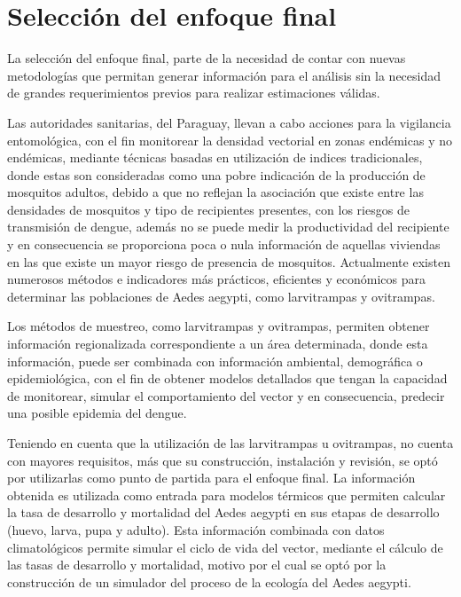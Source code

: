 \section{Selección del enfoque final}
La selección del enfoque final, parte de la necesidad de contar con nuevas metodologías que
permitan generar información para el análisis sin la necesidad de grandes requerimientos previos
para realizar estimaciones válidas.

Las autoridades sanitarias, del Paraguay, llevan a cabo acciones para la vigilancia entomológica,
con el fin monitorear la densidad vectorial en zonas endémicas y no endémicas, mediante técnicas
basadas en utilización de indices tradicionales, donde estas son consideradas como una pobre
indicación de la producción de mosquitos adultos, debido a que no reflejan la asociación que
existe entre las densidades de mosquitos y tipo de recipientes presentes, con los riesgos de
transmisión de dengue, además no se puede medir la productividad del recipiente y en consecuencia
se proporciona poca o nula información de aquellas viviendas en las que existe un mayor riesgo de
presencia de mosquitos. Actualmente existen numerosos métodos e indicadores más prácticos,
eficientes y económicos para determinar las poblaciones de Aedes aegypti, como larvitrampas y
ovitrampas.

Los métodos de muestreo, como larvitrampas y ovitrampas, permiten obtener información regionalizada
correspondiente a un área determinada, donde esta información, puede ser combinada con información
ambiental, demográfica o epidemiológica, con el fin de obtener modelos detallados que tengan la
capacidad de monitorear, simular el comportamiento del vector y en consecuencia, predecir una
posible epidemia del dengue.

Teniendo en cuenta que la utilización de las larvitrampas u ovitrampas, no cuenta con mayores
requisitos, más que su construcción, instalación y revisión, se optó por utilizarlas como punto
de partida para el enfoque final. La información obtenida es utilizada como entrada para
modelos térmicos que permiten calcular la tasa de desarrollo y mortalidad del Aedes aegypti en sus
etapas de desarrollo (huevo, larva, pupa y adulto). Esta información combinada con datos
climatológicos permite simular el ciclo de vida del vector, mediante el cálculo de las tasas de
desarrollo y mortalidad, motivo por el cual se optó por la construcción de un simulador del
proceso de la ecología del Aedes aegypti.
